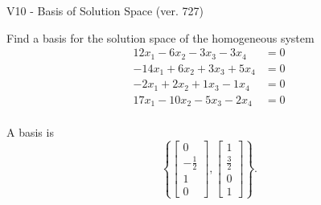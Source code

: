 \begin{exercise}
  \begin{exerciseTitle}V10 - Basis of Solution Space (ver. 727)\end{exerciseTitle}
  \begin{exerciseStatement}
    Find a basis for the solution space of the homogeneous system 
\begin{align*}
 12 x_ 1 -6 x_ 2 -3 x_ 3 -3 x_ 4 &= 0  \\ 
  -14 x_ 1 + 6 x_ 2 + 3 x_ 3 + 5 x_ 4 &= 0  \\ 
  -2 x_ 1 + 2 x_ 2 + 1 x_ 3 -1 x_ 4 &= 0  \\ 
  17 x_ 1 -10 x_ 2 -5 x_ 3 -2 x_ 4 &= 0  \\ 
 \end{align*}


 
  \end{exerciseStatement}

  \begin{exerciseAnswer}
   A basis is   
\[\left\{\left[\begin{array}{c}
0 \\
-\frac{1}{2} \\
1 \\
0
\end{array}\right] , \left[\begin{array}{c}
1 \\
\frac{3}{2} \\
0 \\
1
\end{array}\right]\right\}.\]

  


  \end{exerciseAnswer}
\end{exercise}